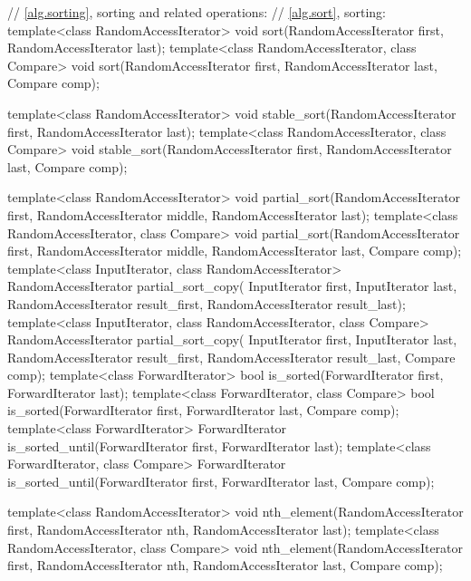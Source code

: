 \begin{codeblock}
{  // \ref{alg.sorting}, sorting and related operations:
  // \ref{alg.sort}, sorting:
  template<class RandomAccessIterator>
    void sort(RandomAccessIterator first, RandomAccessIterator last);
  template<class RandomAccessIterator, class Compare>
    void sort(RandomAccessIterator first, RandomAccessIterator last,
              Compare comp);

  template<class RandomAccessIterator>
    void stable_sort(RandomAccessIterator first, RandomAccessIterator last);
  template<class RandomAccessIterator, class Compare>
    void stable_sort(RandomAccessIterator first, RandomAccessIterator last,
                     Compare comp);

  template<class RandomAccessIterator>
    void partial_sort(RandomAccessIterator first,
                      RandomAccessIterator middle,
                      RandomAccessIterator last);
  template<class RandomAccessIterator, class Compare>
    void partial_sort(RandomAccessIterator first,
                      RandomAccessIterator middle,
                      RandomAccessIterator last, Compare comp);
  template<class InputIterator, class RandomAccessIterator>
    RandomAccessIterator partial_sort_copy(
      InputIterator first, InputIterator last,
      RandomAccessIterator result_first,
      RandomAccessIterator result_last);
  template<class InputIterator, class RandomAccessIterator, class Compare>
    RandomAccessIterator partial_sort_copy(
      InputIterator first, InputIterator last,
      RandomAccessIterator result_first,
      RandomAccessIterator result_last,
      Compare comp);
  template<class ForwardIterator>
    bool is_sorted(ForwardIterator first, ForwardIterator last);
  template<class ForwardIterator, class Compare>
    bool is_sorted(ForwardIterator first, ForwardIterator last,
                   Compare comp);
  template<class ForwardIterator>
    ForwardIterator is_sorted_until(ForwardIterator first, ForwardIterator last);
  template<class ForwardIterator, class Compare>
    ForwardIterator is_sorted_until(ForwardIterator first, ForwardIterator last,
                                    Compare comp);

  template<class RandomAccessIterator>
    void nth_element(RandomAccessIterator first, RandomAccessIterator nth,
                     RandomAccessIterator last);
  template<class RandomAccessIterator, class Compare>
    void nth_element(RandomAccessIterator first, RandomAccessIterator nth,
                     RandomAccessIterator last, Compare comp);

}
\end{codeblock}
